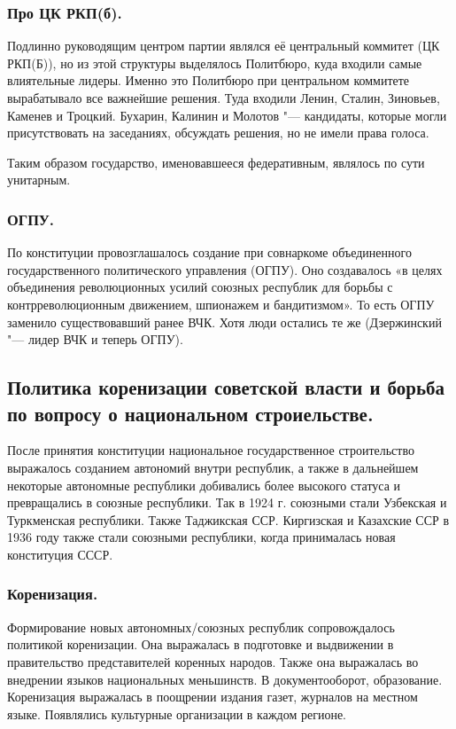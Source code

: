 \subsubsection{\textbf{Про ЦК РКП(б).}}

Подлинно руководящим центром партии являлся её центральный коммитет (ЦК РКП(Б)), но из этой структуры выделялось Политбюро, куда входили самые влиятельные лидеры. Именно это Политбюро при центральном коммитете вырабатывало все важнейшие решения. Туда входили Ленин, Сталин, Зиновьев, Каменев и Троцкий. Бухарин, Калинин и Молотов "--- кандидаты, которые могли присутствовать на заседаниях, обсуждать решения, но не имели права голоса.

Таким образом государство, именовавшееся федеративным, являлось по сути унитарным.

\subsubsection{\textbf{ОГПУ.}}

По конституции провозглашалось создание при совнаркоме объединенного государственного политического управления (ОГПУ). Оно создавалось «в целях объединения революционных усилий союзных республик для борьбы с контрреволюционным движением, шпионажем и бандитизмом». То есть ОГПУ заменило существовавший ранее ВЧК. Хотя люди остались те же (Дзержинский "--- лидер ВЧК и теперь ОГПУ).

\subsection{Политика коренизации советской власти и борьба по вопросу о национальном строиельстве.}

После принятия конституции национальное государственное строительство выражалось созданием автономий внутри республик, а также в дальнейшем некоторые автономные республики добивались более высокого статуса и превращались в союзные республики. Так в 1924 г. союзными стали Узбекская и Туркменская республики. Также Таджикская ССР. Киргизская и Казахские ССР в 1936 году также стали союзными республики, когда принималась новая конституция СССР.

\subsubsection{\textbf{Коренизация.}}

Формирование новых автономных/союзных республик сопровождалось политикой коренизации. Она выражалась в подготовке и выдвижении в правительство представителей коренных народов. Также она выражалась во внедрении языков национальных меньшинств. В документооборот, образование. Коренизация выражалась в поощрении издания газет, журналов на местном языке. Появлялись культурные организации в каждом регионе.

